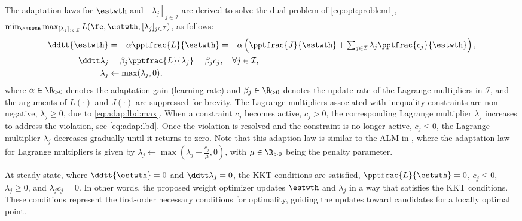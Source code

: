 \documentclass[journal]{IEEEtran}
\begin{document}
The adaptation laws for $\estwth$ and $[\lambda_j]_{j\in\mathcal I}$ are derived to solve the dual problem of \eqref{eq:opt:problem1}, \ie $\min_{\estwth} \max_{[\lambda_j]_{j\in\mathcal I}}L(\fe,\estwth,[\lambda_j]_{j\in\mathcal I})$, as follows:
\begin{subequations}
    \begin{align}
            \ddtt{\estwth}
            &
            =
            -\alpha \pptfrac{L}{\estwth}
            =
            -\alpha 
            \left(
                \pptfrac{J}{\estwth}
                +
                \textstyle\sum_{j\in\mathcal{I}}
                \lambda_j 
                \pptfrac{c_j}{\estwth}
            \right),
        \label{eq:adap:th}
            \\
            \ddtt\lambda_j
            & 
            = 
            \beta_j\pptfrac{L}{\lambda_j} 
            = 
            \beta_j c_j ,
            \quad \forall j\in\mathcal I,
        \label{eq:adap:lbd}
            \\
            \lambda_j & \leftarrow \max(\lambda_j,0) ,
        \label{eq:adap:lbd:max}
    \end{align}
    \label{eq:adaptation law}%
\end{subequations}
where $\alpha\in\R_{>0}$ denotes the adaptation gain (learning rate) and $\beta_j\in\R_{>0}$ denotes the update rate of the Lagrange multipliers in $\mathcal I$, and the arguments of $L(\cdot)$ and $J(\cdot)$ are suppressed for brevity. 
The Lagrange multipliers associated with inequality constraints are non-negative, \ie $\lambda_j\ge 0$, due to \eqref{eq:adap:lbd:max}. 
When a constraint $c_j$ becomes active, \ie $c_j > 0$, the corresponding Lagrange multiplier $\lambda_j$ increases to address the violation, \ie see \eqref{eq:adap:lbd}.
Once the violation is resolved and the constraint is no longer active, \ie $c_j \le 0$, the Lagrange multiplier $\lambda_j$ decreases gradually until it returns to zero.
Note that this adaption law is similar to the ALM in \cite{Nocedal:2006aa}, where the adaptation law for Lagrange multipliers is given by $\lambda_j\leftarrow \max\left(\lambda_j+\tfrac{c_j}{\mu},0\right)$, with $\mu\in\R_{>0}$ being the penalty parameter. 

At steady state, where $\ddtt{\estwth}=0$ and $\ddtt\lambda_j=0$, the KKT conditions are satisfied, \ie $\pptfrac{L}{\estwth}=0$, $c_j \le 0$, $\lambda_j \ge 0$, and $\lambda_j c_j=0$.
In other words, the proposed weight optimizer updates $\estwth$ and $\lambda_j$ in a way that satisfies the KKT conditions. 
These conditions represent the first-order necessary conditions for optimality, guiding the updates toward candidates for a locally optimal point.
\end{document}
